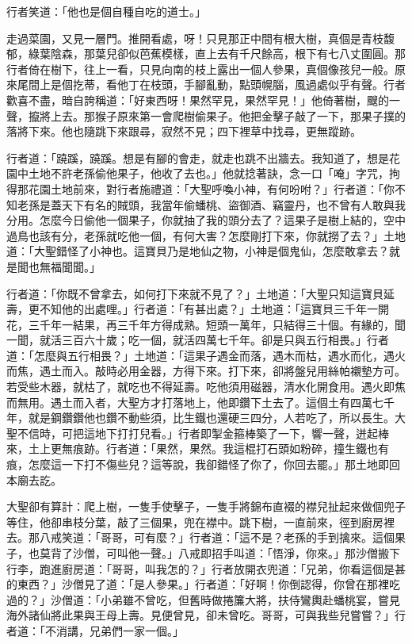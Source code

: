 行者笑道：「他也是個自種自吃的道士。」

走過菜園，又見一層門。推開看處，呀！只見那正中間有根大樹，真個是青枝馥郁，綠葉陰森，那葉兒卻似芭蕉模樣，直上去有千尺餘高，根下有七八丈圍圓。那行者倚在樹下，往上一看，只見向南的枝上露出一個人參果，真個像孩兒一般。原來尾間上是個扢蒂，看他丁在枝頭，手腳亂動，點頭幌腦，風過處似乎有聲。行者歡喜不盡，暗自誇稱道：「好東西呀！果然罕見，果然罕見！」他倚著樹，颼的一聲，攛將上去。那猴子原來第一會爬樹偷果子。他把金擊子敲了一下，那果子撲的落將下來。他也隨跳下來跟尋，寂然不見；四下裡草中找尋，更無蹤跡。

行者道：「蹺蹊，蹺蹊。想是有腳的會走，就走也跳不出牆去。我知道了，想是花園中土地不許老孫偷他果子，他收了去也。」他就捻著訣，念一口「唵」字咒，拘得那花園土地前來，對行者施禮道：「大聖呼喚小神，有何吩咐？」行者道：「你不知老孫是蓋天下有名的賊頭，我當年偷蟠桃、盜御酒、竊靈丹，也不曾有人敢與我分用。怎麼今日偷他一個果子，你就抽了我的頭分去了？這果子是樹上結的，空中過鳥也該有分，老孫就吃他一個，有何大害？怎麼剛打下來，你就撈了去？」土地道：「大聖錯怪了小神也。這寶貝乃是地仙之物，小神是個鬼仙，怎麼敢拿去？就是聞也無福聞聞。」

行者道：「你既不曾拿去，如何打下來就不見了？」土地道：「大聖只知這寶貝延壽，更不知他的出處哩。」行者道：「有甚出處？」土地道：「這寶貝三千年一開花，三千年一結果，再三千年方得成熟。短頭一萬年，只結得三十個。有緣的，聞一聞，就活三百六十歲；吃一個，就活四萬七千年。卻是只與五行相畏。」行者道：「怎麼與五行相畏？」土地道：「這果子遇金而落，遇木而枯，遇水而化，遇火而焦，遇土而入。敲時必用金器，方得下來。打下來，卻將盤兒用絲帕襯墊方可。若受些木器，就枯了，就吃也不得延壽。吃他須用磁器，清水化開食用。遇火即焦而無用。遇土而入者，大聖方才打落地上，他即鑽下土去了。這個土有四萬七千年，就是鋼鑽鑽他也鑽不動些須，比生鐵也還硬三四分，人若吃了，所以長生。大聖不信時，可把這地下打打兒看。」行者即掣金箍棒築了一下，響一聲，迸起棒來，土上更無痕跡。行者道：「果然，果然。我這棍打石頭如粉碎，撞生鐵也有痕，怎麼這一下打不傷些兒？這等說，我卻錯怪了你了，你回去罷。」那土地即回本廟去訖。

大聖卻有算計：爬上樹，一隻手使擊子，一隻手將錦布直裰的襟兒扯起來做個兜子等住，他卻串枝分葉，敲了三個果，兜在襟中。跳下樹，一直前來，徑到廚房裡去。那八戒笑道：「哥哥，可有麼？」行者道：「這不是？老孫的手到擒來。這個果子，也莫背了沙僧，可叫他一聲。」八戒即招手叫道：「悟淨，你來。」那沙僧搬下行李，跑進廚房道：「哥哥，叫我怎的？」行者放開衣兜道：「兄弟，你看這個是甚的東西？」沙僧見了道：「是人參果。」行者道：「好啊！你倒認得，你曾在那裡吃過的？」沙僧道：「小弟雖不曾吃，但舊時做捲簾大將，扶侍鸞輿赴蟠桃宴，嘗見海外諸仙將此果與王母上壽。見便曾見，卻未曾吃。哥哥，可與我些兒嘗嘗？」行者道：「不消講，兄弟們一家一個。」

